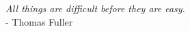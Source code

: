 \vspace*{3cm}

\begin{flushright}
	\emph{All things are difficult before they are easy.} \\
	\medskip - Thomas Fuller
\end{flushright}

\begin{center}
\end{center}


%
